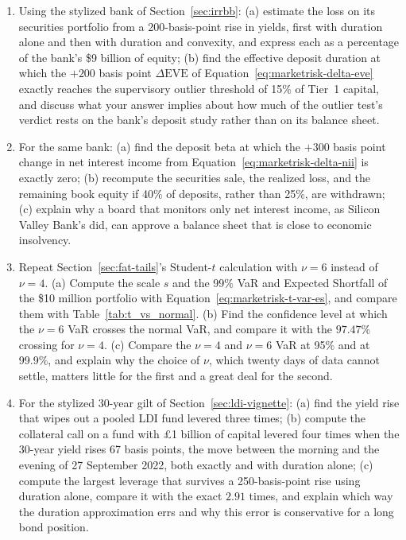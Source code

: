 \documentclass[../ai_in_finance]{subfiles}
\begin{document}
\begin{enumerate}[exercises]
    \item Using the stylized bank of Section~\ref{sec:irrbb}: (a) estimate the loss on its securities portfolio from a 200-basis-point rise in yields, first with duration alone and then with duration and convexity, and express each as a percentage of the bank's \$9 billion of equity; (b) find the effective deposit duration at which the $+200$ basis point $\Delta\text{EVE}$ of Equation~\eqref{eq:marketrisk-delta-eve} exactly reaches the supervisory outlier threshold of 15\% of Tier~1 capital, and discuss what your answer implies about how much of the outlier test's verdict rests on the bank's deposit study rather than on its balance sheet.
    \item For the same bank: (a) find the deposit beta at which the $+300$ basis point change in net interest income from Equation~\eqref{eq:marketrisk-delta-nii} is exactly zero; (b) recompute the securities sale, the realized loss, and the remaining book equity if 40\% of deposits, rather than 25\%, are withdrawn; (c) explain why a board that monitors only net interest income, as Silicon Valley Bank's did, can approve a balance sheet that is close to economic insolvency.
    \item Repeat Section~\ref{sec:fat-tails}'s Student-$t$ calculation with $\nu=6$ instead of $\nu=4$. (a) Compute the scale $s$ and the 99\% VaR and Expected Shortfall of the \$10 million portfolio with Equation~\eqref{eq:marketrisk-t-var-es}, and compare them with Table~\ref{tab:t_vs_normal}. (b) Find the confidence level at which the $\nu=6$ VaR crosses the normal VaR, and compare it with the $97.47\%$ crossing for $\nu=4$. (c) Compare the $\nu=4$ and $\nu=6$ VaR at 95\% and at 99.9\%, and explain why the choice of $\nu$, which twenty days of data cannot settle, matters little for the first and a great deal for the second.
    \item For the stylized 30-year gilt of Section~\ref{sec:ldi-vignette}: (a) find the yield rise that wipes out a pooled LDI fund levered three times; (b) compute the collateral call on a fund with \pounds1 billion of capital levered four times when the 30-year yield rises 67 basis points, the move between the morning and the evening of 27 September 2022, both exactly and with duration alone; (c) compute the largest leverage that survives a 250-basis-point rise using duration alone, compare it with the exact $2.91$ times, and explain which way the duration approximation errs and why this error is conservative for a long bond position.

\end{enumerate}
\end{document}
